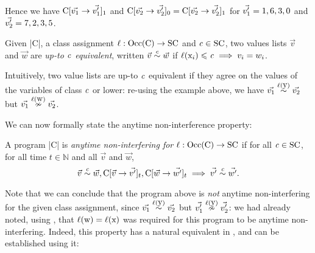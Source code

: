 \noindent Hence we have \(\prc|C|[\vec{v_1} \rightarrow
\vec{v_1'}]_1\) and \(\prc|C|[\vec{v_2} \rightarrow \vec{v_2'}]_0 =
\prc|C|[\vec{v_2} \rightarrow \vec{v_2'}]_1\) for \(\vec{v_1'} = \prc|1|,
\prc|6|, \prc|3|, \prc|0|\) and \(\vec{v_2'} = \prc|7|, \prc|2|,
\prc|3|, \prc|5|\).

\begin{definition} Given \prc|C|, a
class assignment \(\ell : \Occ(\prc|C|) \to
\SC\) and \(\mathit{c} \in
\mathrm{SC}\), two values lists \(\vec{v}\) and \(\vec{w}\)
are \emph{up-to \(\mathit{c}\) equivalent}, written \(\vec{v} \upce{\scl{c}}
\vec{w}\) if \ensuremath{\ell(\prc|x$_i$|) \leqslant \scl{c}
\implies v_i=w_i}. \end{definition}

Intuitively, two value lists are up-to \(\mathit{c}\) equivalent if
they agree on the values of the variables of class \(\mathit{c}\) or lower:
re-using the example above, we have \(\vec{v_1} \upce{\lvl{\prc|y|}}
\vec{v_2}\) but  \(\vec{v_1} \nupce{\lvl{\prc|w|}}
\vec{v_2}\).

We can now formally state the anytime
non-interference property:

\begin{definition}%
\label{def:com-ni}
A program \prc|C| is \emph{anytime non-interfering for \(\ell :
\Occ(\prc|C|) \to \SC\)} if for all
 \(\mathit{c} \in \mathrm{SC}\), for all time \(t \in
\mathbb{N}\) and all \(\vec{v}\) and
\(\vec{w}\),
\[
\vec{v}\upce{\scl{c}} \vec{w}, \prc|C|[\vec{v} \rightarrow \vec{v'}]_t,
\prc|C|[\vec{w} \rightarrow \vec{w'}]_t \implies \vec{v'}\upce{\scl{c}}
\vec{w'}\text{.}
\]
\end{definition}

Note that we can conclude that the program above is \emph{not} anytime
non-interfering for the given class assignment,
since \(\vec{v_1} \upce{\lvl{\prc|y|}} \vec{v_2}\) but
\(\vec{v_1'} \nupce{\lvl{\prc|y|}} \vec{v_2'}\): we had already
noted, using \lname, that \(\ell(\prc|w|) = \ell(\prc|x|)\) was
required for this program to be anytime
non-interfering. Indeed, this property has a
natural equivalent in \lname, and can be established using it:

